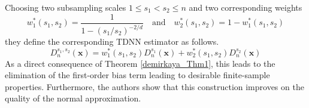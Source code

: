 \documentclass[letterpaper,10pt]{article}
\numberwithin{equation}{section}
\numberwithin{theorem}{section}
\theoremstyle{definition}
\newcommand{\1}{\mathbb{1}}
\begin{document}
Choosing two subsampling scales $1 \leq s_1 < s_2 \leq n$ and two corresponding weights
\begin{equation}
	w_1^{*}(s_1, s_2) = \frac{1}{1-(s_1/s_2)^{-2/d}}
	\quad\text{and}\quad
	w_2^{*}(s_1, s_2) = 1 - w_1^{*}(s_1, s_2)
\end{equation}
they define the corresponding TDNN estimator as follows.
\begin{equation}
	D_n^{s_1, s_2}\left(\mathbf{x}\right)
	= w_1^{*}(s_1, s_2)D_{n}^{s_1}\left(\mathbf{x}\right) + w_2^{*}(s_1, s_2)D_{n}^{s_2}\left(\mathbf{x}\right)
\end{equation}
As a direct consequence of Theorem \ref{demirkaya_Thm1}, this leads to the elimination of the first-order bias term leading to desirable finite-sample properties.
Furthermore, the authors show that this construction improves on the quality of the normal approximation.
\end{document}

